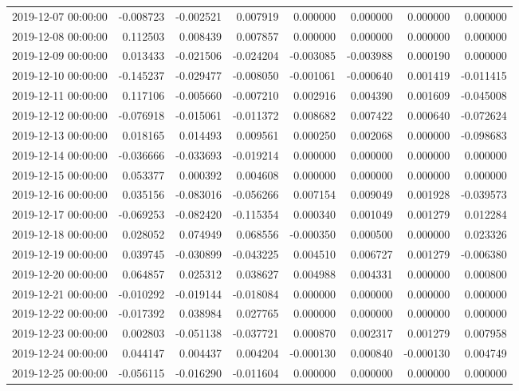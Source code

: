 \begin{tabular}{lrrrrrrr}
2019-12-07 00:00:00 & -0.008723 & -0.002521 & 0.007919 & 0.000000 & 0.000000 & 0.000000 & 0.000000 \\
2019-12-08 00:00:00 & 0.112503 & 0.008439 & 0.007857 & 0.000000 & 0.000000 & 0.000000 & 0.000000 \\
2019-12-09 00:00:00 & 0.013433 & -0.021506 & -0.024204 & -0.003085 & -0.003988 & 0.000190 & 0.000000 \\
2019-12-10 00:00:00 & -0.145237 & -0.029477 & -0.008050 & -0.001061 & -0.000640 & 0.001419 & -0.011415 \\
2019-12-11 00:00:00 & 0.117106 & -0.005660 & -0.007210 & 0.002916 & 0.004390 & 0.001609 & -0.045008 \\
2019-12-12 00:00:00 & -0.076918 & -0.015061 & -0.011372 & 0.008682 & 0.007422 & 0.000640 & -0.072624 \\
2019-12-13 00:00:00 & 0.018165 & 0.014493 & 0.009561 & 0.000250 & 0.002068 & 0.000000 & -0.098683 \\
2019-12-14 00:00:00 & -0.036666 & -0.033693 & -0.019214 & 0.000000 & 0.000000 & 0.000000 & 0.000000 \\
2019-12-15 00:00:00 & 0.053377 & 0.000392 & 0.004608 & 0.000000 & 0.000000 & 0.000000 & 0.000000 \\
2019-12-16 00:00:00 & 0.035156 & -0.083016 & -0.056266 & 0.007154 & 0.009049 & 0.001928 & -0.039573 \\
2019-12-17 00:00:00 & -0.069253 & -0.082420 & -0.115354 & 0.000340 & 0.001049 & 0.001279 & 0.012284 \\
2019-12-18 00:00:00 & 0.028052 & 0.074949 & 0.068556 & -0.000350 & 0.000500 & 0.000000 & 0.023326 \\
2019-12-19 00:00:00 & 0.039745 & -0.030899 & -0.043225 & 0.004510 & 0.006727 & 0.001279 & -0.006380 \\
2019-12-20 00:00:00 & 0.064857 & 0.025312 & 0.038627 & 0.004988 & 0.004331 & 0.000000 & 0.000800 \\
2019-12-21 00:00:00 & -0.010292 & -0.019144 & -0.018084 & 0.000000 & 0.000000 & 0.000000 & 0.000000 \\
2019-12-22 00:00:00 & -0.017392 & 0.038984 & 0.027765 & 0.000000 & 0.000000 & 0.000000 & 0.000000 \\
2019-12-23 00:00:00 & 0.002803 & -0.051138 & -0.037721 & 0.000870 & 0.002317 & 0.001279 & 0.007958 \\
2019-12-24 00:00:00 & 0.044147 & 0.004437 & 0.004204 & -0.000130 & 0.000840 & -0.000130 & 0.004749 \\
2019-12-25 00:00:00 & -0.056115 & -0.016290 & -0.011604 & 0.000000 & 0.000000 & 0.000000 & 0.000000 \\

\end{tabular}
